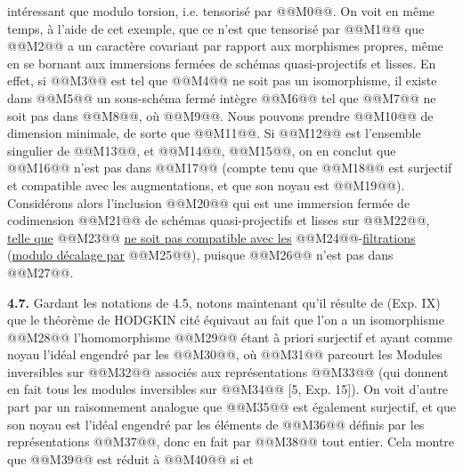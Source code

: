 
intéressant que modulo torsion, i.e. tensorisé par @@M0@@. On voit en même temps, à l'aide de cet exemple, que ce n'est que tensorisé par @@M1@@ que @@M2@@ a un caractère covariant par rapport aux morphismes propres, même en se bornant aux immersions fermées de schémas quasi-projectifs et lisses. En effet, si @@M3@@ est tel que @@M4@@ ne soit pas un isomorphisme, il existe dans @@M5@@ un sous-schéma fermé intègre @@M6@@ tel que @@M7@@ ne soit pas dans @@M8@@, où @@M9@@. Nous pouvons prendre @@M10@@ de dimension minimale, de sorte que @@M11@@. Si @@M12@@ est l'ensemble singulier de @@M13@@, et @@M14@@, @@M15@@, on en conclut que @@M16@@ n'est pas dans @@M17@@ (compte tenu que @@M18@@ est surjectif et compatible avec les augmentations, et que son noyau est @@M19@@). Considérons alors l'inclusion
@@M20@@
qui est une immersion fermée de codimension @@M21@@ de schémas quasi-projectifs et lisses sur @@M22@@, \uline{telle que}
@@M23@@
\uline{ne soit pas compatible avec les} @@M24@@-\uline{filtrations} (\uline{modulo décalage par} @@M25@@), puisque @@M26@@ n'est pas dans @@M27@@.

\textbf{4.7.} Gardant les notations de 4.5, notons maintenant qu'il résulte de (Exp. IX) que le théorème de HODGKIN cité équivaut au fait que l'on a un isomorphisme
@@M28@@
l'homomorphisme @@M29@@ étant à priori surjectif et ayant comme noyau l'idéal engendré par les @@M30@@, où @@M31@@ parcourt les Modules inversibles sur @@M32@@ associés aux représentations @@M33@@ (qui donnent en fait tous les modules inversibles sur @@M34@@ [5, Exp. 15]). On voit d'autre part par un raisonnement analogue que
@@M35@@
est également surjectif, et que son noyau est l'idéal engendré par les éléments de @@M36@@ définis par les représentations @@M37@@, donc en fait par @@M38@@ tout entier. Cela montre que @@M39@@ est réduit à @@M40@@ si et

